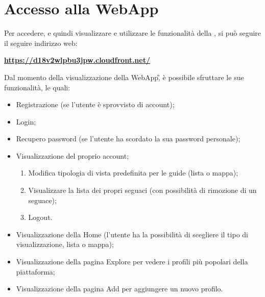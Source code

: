 \section{Accesso alla WebApp} {
    Per accedere, e quindi visualizzare e utilizzare le funzionalità della , si può seguire il seguire indirizzo web:
    
    \begin{center}
        \textbf{\url{https://d18v2wlpbu3jpw.cloudfront.net/}}
    \end{center}

    Dal momento della visualizzazione della WebApp\G, è possibile sfruttare le sue funzionalità, le quali:
    \begin{itemize}
        \item Registrazione (se l'utente è sprovvisto di account);
        \item Login;
        \item Recupero password (se l'utente ha scordato la sua password personale);
        \item Visualizzazione del proprio account;
        \begin{enumerate}
            \item Modifica tipologia di vista predefinita per le guide (lista o mappa);
            \item Visualizzare la lista dei propri seguaci (con possibilità di rimozione di un seguace);
            \item Logout.
        \end{enumerate}
        \item Visualizzazione della Home (l'utente ha la possibilità di scegliere il tipo di visualizzazione, lista o mappa);
        \item Visualizzazione della pagina Explore per vedere i profili più popolari della piattaforma;
        \item Visualizzazione della pagina Add per aggiungere un nuovo profilo.
  
    \end{itemize}

}
